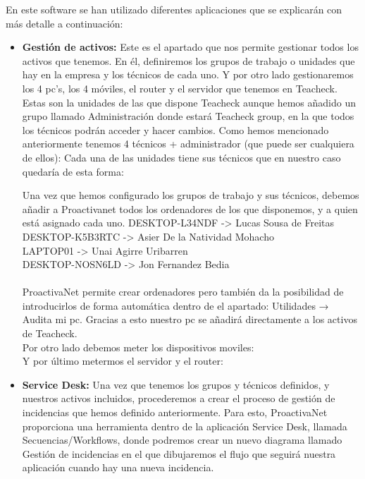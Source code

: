 En este software se han utilizado diferentes aplicaciones que se explicarán con más detalle a continuación:
\begin{itemize}
\item{\textbf{Gestión de activos: }}Este es el apartado que nos permite gestionar todos los activos que tenemos. En él, definiremos los grupos de trabajo o unidades que hay en la empresa y los técnicos de cada uno. Y por otro lado gestionaremos los 4 pc’s, los 4 móviles, el router y el servidor que tenemos en Teacheck.
Estas son la unidades de las que dispone Teacheck aunque hemos añadido un grupo llamado Administración donde estará Teacheck group, en la que todos los técnicos podrán acceder y hacer cambios.
Como hemos mencionado anteriormente tenemos 4 técnicos + administrador (que puede ser cualquiera de ellos):
Cada una de las unidades tiene sus técnicos que en nuestro caso quedaría de esta forma:

Una vez que hemos configurado los grupos de trabajo y sus técnicos, debemos añadir a Proactivanet todos los ordenadores de los que disponemos, y a quien está asignado cada uno.
DESKTOP-L34NDF           ->        Lucas Sousa de Freitas\\
DESKTOP-K5B3RTC        ->        Asier De la Natividad Mohacho\\
LAPTOP01                         ->        Unai Agirre Uribarren\\
DESKTOP-NOSN6LD       ->        Jon Fernandez Bedia\\
\\
ProactivaNet permite crear ordenadores pero también da la posibilidad de introducirlos de forma automática dentro de el apartado:  Utilidades → Audita mi pc. Gracias a esto nuestro pc se añadirá directamente a los activos de Teacheck.
\\
Por otro lado debemos meter los dispositivos moviles:
\\
Y por último metermos el servidor y el router:
\\
\item{\textbf{Service Desk: }}Una vez que tenemos los grupos y técnicos definidos, y nuestros activos incluidos, procederemos a crear el proceso de gestión de incidencias que hemos definido anteriormente. Para esto, ProactivaNet proporciona una herramienta dentro de la aplicación Service Desk, llamada Secuencias/Workflows, donde podremos crear un nuevo diagrama llamado Gestión de incidencias en el que dibujaremos el flujo que seguirá nuestra aplicación cuando hay una nueva incidencia.


\end{itemize}
